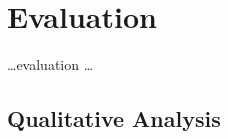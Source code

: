 \chapter{Evaluation}
\label{sec:evaluation}


\ldots evaluation \ldots


\section{Qualitative Analysis}


